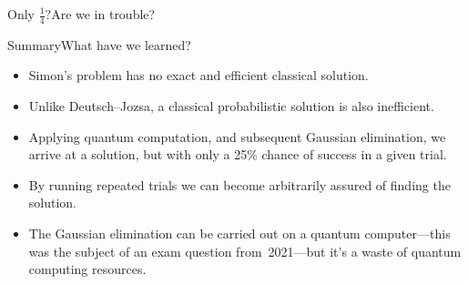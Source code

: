 \begin{frame}{Only $\frac{1}{4}$?}{Are we in trouble?}
\Vskip{-4em}
\end{frame}

\begin{frame}{Summary}{What have we learned?}

\begin{itemize}
    \item Simon's problem has no exact and efficient classical solution.
    \item Unlike Deutsch--Jozsa, a classical probabilistic solution is also inefficient.
    \item Applying quantum computation, and subsequent Gaussian elimination, we arrive at a solution, but with only a 25\% chance of success in a given trial.
    \item By running repeated trials we can become arbitrarily assured of finding the solution.
    \item The Gaussian elimination can be carried out on a quantum computer---this was the subject of an exam question from~2021---but it's a waste of quantum computing resources.
\end{itemize}
    
\end{frame}
